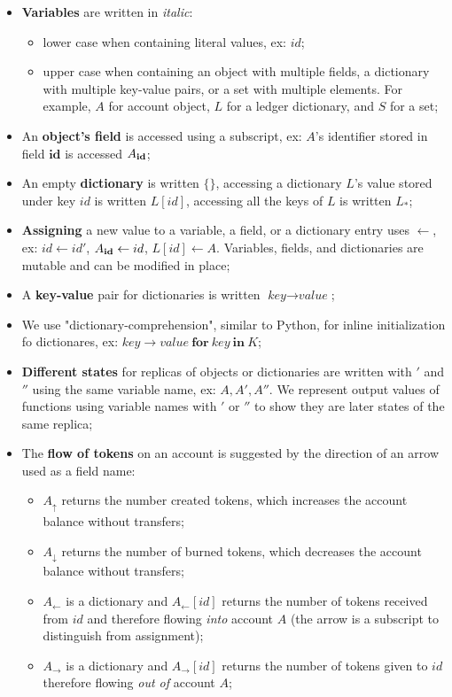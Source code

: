 \documentclass[9pt, oneside]{article}   	%
\begin{document}
\begin{itemize}
	\item \textbf{Variables} are written in \textit{italic}:
		\begin{itemize}
			\item  lower case when containing literal values, ex: $id$;
			\item upper case when containing an object with multiple fields, a dictionary with multiple key-value pairs, or a set with multiple elements. For example, $A$ for account object, $L$ for a ledger dictionary, and $S$ for a set;
		\end{itemize}
	\item An \textbf{object's field} is accessed using a subscript, ex: $A$'s identifier stored in field $\textbf{id}$ is accessed $A_{\scriptsize \textbf{id}}$;
	\item An empty \textbf{dictionary} is written $\{\}$, accessing a dictionary $L$'s value stored under key $id$ is written $L[id]$, accessing all the keys of $L$ is written $L_*$;
	\item \textbf{Assigning} a new value to a variable, a field, or a dictionary entry uses $\leftarrow$, ex: $id \leftarrow id'$, $A_{\scriptsize\textbf{id}} \leftarrow id$, $L[id] \leftarrow A$. Variables, fields, and dictionaries are mutable and can be modified in place;
	 \item A \textbf{key-value} pair for dictionaries is written $\textit{key} \rightarrow \textit{value}$;
	 \item We use "dictionary-comprehension", similar to Python, for inline initialization fo dictionares, ex: ${ \textit{key} \rightarrow \textit{value} ~\textbf{for}~ \textit{key} ~\textbf{in}~ K }$;
	\item \textbf{Different states} for replicas of objects or dictionaries are written with $'$ and $''$ using the same variable name, ex: $A, A', A''$. We represent output values of functions using variable names with $'$ or $''$ to show they are later states of the same replica;
	\item The  \textbf{flow of tokens} on an account is suggested by the direction of an arrow used as a field name: 
		\begin{itemize}
			\item $A_\uparrow$ returns the number created tokens, which increases the account balance without transfers;
			\item $A_\downarrow$ returns the number of burned tokens, which decreases the account balance without transfers;
			\item $A_{\leftarrow}$ is a dictionary and $A_{\leftarrow}[id]$ returns the number of tokens received from $id$ and therefore flowing \textit{into} account $A$ (the arrow is a subscript to distinguish from assignment);
			\item $A_{\rightarrow}$ is a dictionary and $A_{\rightarrow}[id]$ returns the number of tokens given to $id$ therefore flowing \textit{out of} account $A$;
		\end{itemize}
\end{itemize}
\end{document}
